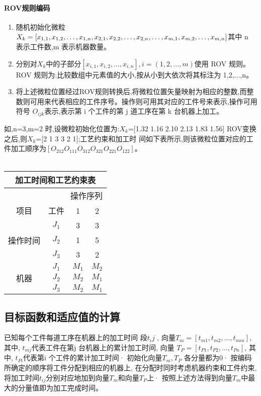 \documentclass[UTF8]{ctexart}
\begin{document}
\begin{multicols}{2}
\paragraph{ROV规则编码}
\begin{enumerate}
	\item 随机初始化微粒$X_k=[x_{1,1},x_{1,2},\ldots,x_{1,n},x_{2,1},x_{2,2}\\,\ldots, x_{2,n},\ldots,x_{m,1},x_{m,2},\ldots,x_{m,n}]$其中 n 表示工件数,m 表示机器数量。
	\item 分别对$X_k$中的子部分$[x_{i,1},x_{i,2},\ldots,x_{i,n}],i=(1,2,\ldots, m)$使用 ROV 规则。ROV 规则为:比较数组中元素值的大小,按从小到大依次将其标注为 1,2,...,n。
	\item 将上述微粒位置经过ROV规则转换后,将微粒位置矢量映射为相应的整数,而整数则可用来代表相应的工件序号。操作则可用其对应的工件号来表示,操作可用符号 $O_{ijk}$表示,表示第 i 个工件的第 j 道工序在第 k 台机器上加工。
\end{enumerate}
\indent 如,n=3,m=2 时,设微粒初始化位置为:$X_k$=[1.32 1.16 2.10 2.13 1.83 1.56] ROV变换之后,则$X_k$=[2 1 3 3 2 1];工艺约束和加工时
间如下表所示,则该微粒位置对应的工件加工顺序为$[O_{212}O_{111}O_{312}O_{321}O_{221}O_{122}]$。\\\\
\indent
\begin{tabular}{cccc}
\multicolumn{4}{c}{\textbf{加工时间和工艺约束表}} \\
\hline
\multicolumn{4}{r}{操作序列} \\
\cline{3-4}
项目 & 工件 & 1 & 2 \\
\hline
\multirow{3}{*}{操作时间}
& $J_1$ & 3 & 3 \\
& $J_2$ & 1 & 5 \\ 
& $J_3$ & 3 & 2 \\
\hline
\multirow{3}{*}{机器}  
& $J_1$ & $M_1$ & $M_2$ \\
& $J_2$ & $M_2$ & $M_1$ \\
& $J_3$ & $M_2$ & $M_1$ \\
\hline
\end{tabular}

\subsection{目标函数和适应值的计算}
已知每个工件每道工序在机器上的加工时间
段$t_ij$ , 向量$T_m =[ t_{m1} , t_{m2} ,\ldots , t_{mm}]$,其中, $t_{mj}$代表工件在第j 台机器上的累计加工时间, 向量
$T_P =[ t_{P1} , t_{P2} , \ldots , t_{Pn}]$, 其中, $t_{Pi}$代表第i 个工件的累计加工时间· 初始化向量$T_m , T_P$ 各分量都为0· 按编码所确定的顺序将工件分配到相应的机器上, 在分配时同时考虑机器约束和工件约束, 将加工时间$t_{ij}$分别对应地加到向量$T_m$和向量$T_P$上· 按照上述方法得到向量$T_m$中最大的分量值即为加工完成时间。

\end{multicols}
\end{document}
